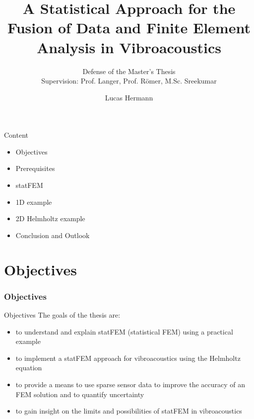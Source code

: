 \documentclass[fleqn,11pt,aspectratio=43]{beamer}
\title{A Statistical Approach for the Fusion of
Data and Finite Element Analysis in
Vibroacoustics}
\subtitle{Defense of the Master's Thesis\\ Supervision: Prof. Langer, Prof. Römer, M.Sc. Sreekumar}
\author{Lucas Hermann}
\begin{document}
\begin{frame}[plain]
\titlepage
\end{frame}
\begin{frame}{Content}
%
%
\begin{itemize}
\item Objectives
\item Prerequisites
\item statFEM
\item 1D example
\item 2D Helmholtz example
\item Conclusion and Outlook

\end{itemize}
\end{frame}
\part{Objectives}

\begin{frame}[plain]
  \partpage
\end{frame}


\section{Objectives}





\begin{frame}{Objectives}
The goals of the thesis are:
\begin{itemize}
	\item to understand and explain statFEM (statistical FEM) using a practical example
 	\item to implement a statFEM approach for vibroacoustics using the Helmholtz equation
  \item to provide a means to use sparse sensor data to improve the accuracy of an FEM solution and to quantify uncertainty
  \item to gain insight on the limits and possibilities of statFEM in vibroacoustics
\end{itemize}

\end{frame}
\end{document}
